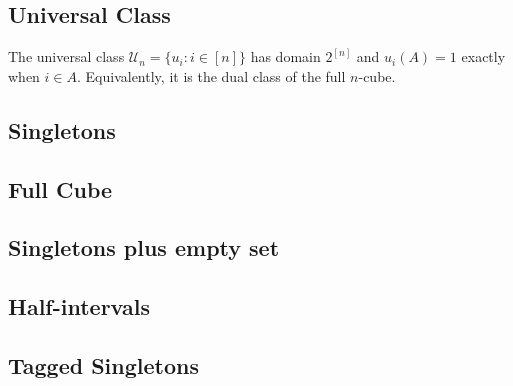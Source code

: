   \subsection{Universal Class}\label{cl:universal_class}
  \begin{definition}
  The universal class $\mathcal U_n=\{u_i:i\in[n]\}$ has domain $2^{[n]}$
  and $u_i(A)=1$ exactly when $i\in A$.  Equivalently, it is the dual class
  of the full $n$-cube.
  \end{definition}
  \subsection{Singletons}\label{cl:singletons}
  \begin{definition}[Singletons - {$\{\{i\}\}_{1\le i\le n}$}]
  
  \end{definition}
  
  \subsection{Full Cube}\label{cl:full_cube}
  \begin{definition}
  
  \end{definition}
  
  \subsection{Singletons plus empty set}\label{cl:singletons_plus_empty_set}
  \begin{definition}
  
  \end{definition}
  
  \subsection{Half-intervals}\label{cl:half-intervals}
  \begin{definition}
  
  \end{definition}
  
  \subsection{Tagged Singletons}\label{cl:tagged_singletons}
  \begin{definition}
  
  \end{definition}
  
